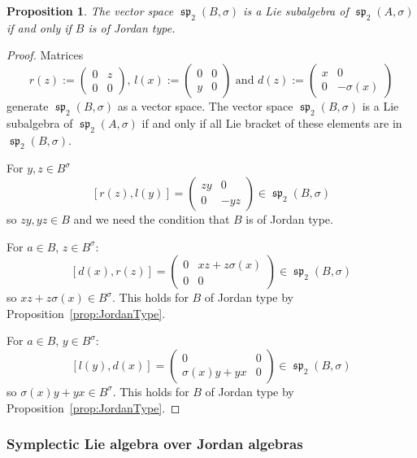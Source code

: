 \documentclass[a4paper,oneside,11pt]{amsart}
\DeclareMathOperator{\spp}{\mathfrak{sp}}
\theoremstyle{plain}
\newtheorem{prop}[teo]{Proposition}
\theoremstyle{definition}
\theoremstyle{remark}
\begin{document}
\begin{prop}\label{spp_sublie}
The vector space $\spp_2(B,\sigma)$ is a Lie subalgebra of $\spp_2(A,\sigma)$ if and only if $B$ is of Jordan type.
\end{prop}

\begin{proof}
Matrices
$$r(z):=\begin{pmatrix}
    0 & z \\
    0 & 0
    \end{pmatrix},\,
l(x):=\begin{pmatrix}
    0 & 0 \\
    y & 0
    \end{pmatrix}\text{ and }
d(z):=\begin{pmatrix}
    x & 0 \\
    0 & -\sigma(x)
    \end{pmatrix}$$
generate $\spp_2(B,\sigma)$ as a vector space. The vector space $\spp_2(B,\sigma)$ is a Lie subalgebra of $\spp_2(A,\sigma)$ if and only if all Lie bracket of these elements are in $\spp_2(B,\sigma)$.

For $y,z\in B^{\sigma}$
$$[r(z),l(y)]=
\begin{pmatrix}
    zy & 0 \\
    0 & -yz
    \end{pmatrix}\in\spp_2(B,\sigma)$$
so $zy,yz\in B$ and we need the condition that $B$ is of Jordan type.

For $a\in B$, $z\in B^{\sigma}$:
$$[d(x),r(z)]=
\begin{pmatrix}
    0 & xz+z\sigma(x) \\
    0 & 0
    \end{pmatrix}\in\spp_2(B,\sigma)$$
so $xz+z\sigma(x)\in B^{\sigma}$. This holds for $B$ of Jordan type by Proposition~\ref{prop:JordanType}.

For $a\in B$, $y\in B^{\sigma}$:
$$[l(y),d(x)]=
\begin{pmatrix}
    0 & 0 \\
    \sigma(x)y+yx & 0
    \end{pmatrix}\in\spp_2(B,\sigma)$$
so $\sigma(x)y+yx\in B^{\sigma}$. This holds for $B$ of Jordan type by Proposition~\ref{prop:JordanType}.
\end{proof}

\subsubsection{Symplectic Lie algebra over Jordan algebras}
\end{document}
